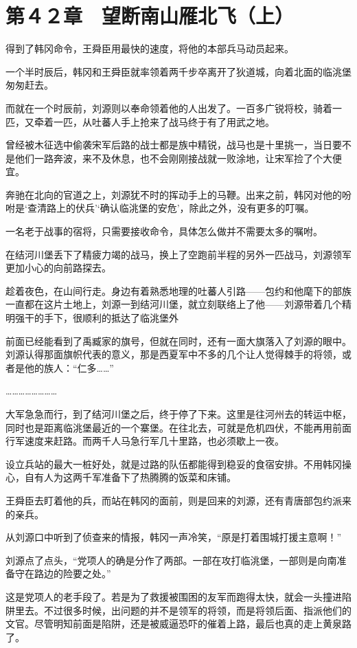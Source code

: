 \section{第４２章　望断南山雁北飞（上）}

得到了韩冈命令，王舜臣用最快的速度，将他的本部兵马动员起来。

一个半时辰后，韩冈和王舜臣就率领着两千步卒离开了狄道城，向着北面的临洮堡匆匆赶去。

而就在一个时辰前，刘源则以奉命领着他的人出发了。一百多广锐将校，骑着一匹，又牵着一匹，从吐蕃人手上抢来了战马终于有了用武之地。

曾经被木征选中偷袭宋军后路的战士都是族中精锐，战马也是十里挑一，当日要不是他们一路奔波，来不及休息，也不会刚刚接战就一败涂地，让宋军捡了个大便宜。

奔驰在北向的官道之上，刘源犹不时的挥动手上的马鞭。出来之前，韩冈对他的吩咐是‘查清路上的伏兵’‘确认临洮堡的安危’，除此之外，没有更多的叮嘱。

一名老于战事的宿将，只需要接收命令，具体怎么做并不需要太多的嘱咐。

在结河川堡丢下了精疲力竭的战马，换上了空跑前半程的另外一匹战马，刘源领军更加小心的向前路探去。

趁着夜色，在山间行走。身边有着熟悉地理的吐蕃人引路——包约和他麾下的部族一直都在这片土地上，刘源一到结河川堡，就立刻联络上了他——刘源带着几个精明强干的手下，很顺利的抵达了临洮堡外

前面已经能看到了禹臧家的旗号，但就在同时，还有一面大旗落入了刘源的眼中。刘源认得那面旗帜代表的意义，那是西夏军中不多的几个让人觉得棘手的将领，或者是他的族人：“仁多……”

……………………

大军急急而行，到了结河川堡之后，终于停了下来。这里是往河州去的转运中枢，同时也是距离临洮堡最近的一个寨堡。在往北去，可就是危机四伏，不能再用前面行军速度来赶路。而两千人马急行军几十里路，也必须歇上一夜。

设立兵站的最大一桩好处，就是过路的队伍都能得到稳妥的食宿安排。不用韩冈操心，自有人为这两千军准备下了热腾腾的饭菜和床铺。

王舜臣去盯着他的兵，而站在韩冈的面前，则是回来的刘源，还有青唐部包约派来的亲兵。

从刘源口中听到了侦查来的情报，韩冈一声冷笑，“原是打着围城打援主意啊！”

刘源点了点头，“党项人的确是分作了两部。一部在攻打临洮堡，一部则是向南准备守在路边的险要之处。”

这是党项人的老手段了。若是为了救援被围困的友军而跑得太快，就会一头撞进陷阱里去。不过很多时候，出问题的并不是领军的将领，而是将领后面、指派他们的文官。尽管明知前面是陷阱，还是被威逼恐吓的催着上路，最后也真的走上黄泉路了。

